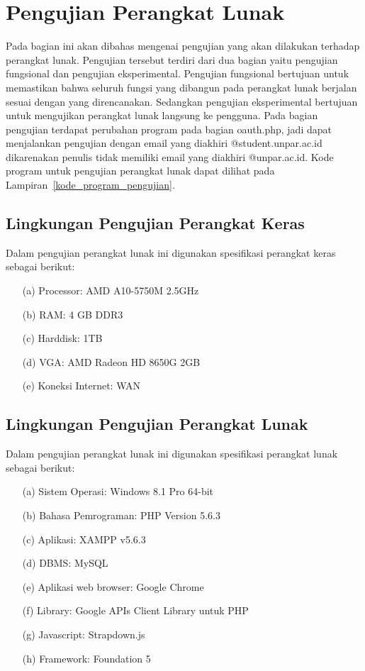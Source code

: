 \section{Pengujian Perangkat Lunak}
\label{sec:pengujianperangkatlunak}

Pada bagian ini akan dibahas mengenai pengujian yang akan dilakukan terhadap perangkat lunak. Pengujian tersebut terdiri dari dua bagian yaitu pengujian fungsional dan pengujian eksperimental. Pengujian fungsional bertujuan untuk memastikan bahwa seluruh fungsi yang dibangun pada perangkat lunak berjalan sesuai dengan yang direncanakan. Sedangkan pengujian eksperimental bertujuan untuk mengujikan perangkat lunak langsung ke pengguna. Pada bagian pengujian terdapat perubahan program pada bagian oauth.php, jadi dapat menjalankan pengujian dengan email yang diakhiri @student.unpar.ac.id dikarenakan penulis tidak memiliki email yang diakhiri @unpar.ac.id. Kode program untuk pengujian perangkat lunak dapat dilihat pada Lampiran~\ref{kode_program_pengujian}.

\subsection{Lingkungan Pengujian Perangkat Keras}
\label{sec:lingkunganpengujianperangkatkeras}

Dalam pengujian perangkat lunak ini digunakan spesifikasi perangkat keras sebagai berikut:

\begin{enumerate}
\item[(a)] Processor: AMD A10-5750M 2.5GHz
\item[(b)] RAM: 4 GB DDR3
\item[(c)] Harddisk: 1TB
\item[(d)] VGA: AMD Radeon HD 8650G 2GB
\item[(e)] Koneksi Internet: WAN
\end{enumerate}

\subsection{Lingkungan Pengujian Perangkat Lunak}
\label{sec:lingkunganpengujianperangkatlunak}

Dalam pengujian perangkat lunak ini digunakan spesifikasi perangkat lunak sebagai berikut:

\begin{enumerate}
\item[(a)] Sistem Operasi: Windows 8.1 Pro 64-bit
\item[(b)] Bahasa Pemrograman: PHP Version 5.6.3
\item[(c)] Aplikasi: XAMPP v5.6.3
\item[(d)] DBMS: MySQL
\item[(e)] Aplikasi web browser: Google Chrome
\item[(f)] Library: Google APIs Client Library untuk PHP
\item[(g)] Javascript: Strapdown.js
\item[(h)] Framework: Foundation 5
\end{enumerate}

